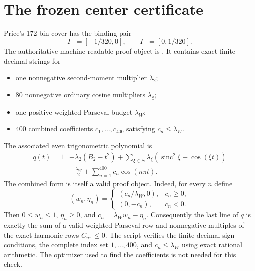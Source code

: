 \documentclass[11pt]{amsart}
\DeclareMathOperator{\sinc}{sinc}
\begin{document}
\section{The frozen center certificate}
Price's 172-bin cover has the binding pair
\[
 I_-=[-1/320,0],\qquad I_+=[0,1/320].
\]
The authoritative machine-readable proof object is
.
It contains exact finite-decimal strings for
\begin{itemize}
\item one nonnegative second-moment multiplier $\lambda_2$;
\item 80 nonnegative ordinary cosine multipliers $\lambda_\xi$;
\item one positive weighted-Parseval budget $\lambda_W$;
\item 400 combined coefficients $c_1,\ldots,c_{400}$ satisfying
      $c_n\le\lambda_W$.
\end{itemize}
The associated even trigonometric polynomial is
\begin{align*}
q(t)=1&+\lambda_2(B_2-t^2)
+\sum_{\xi\in\Xi}\lambda_\xi(\sinc^2\xi-\cos(\xi t))\\
&+\frac{\lambda_W}{2}+\sum_{n=1}^{400}c_n\cos(n\pi t).
\end{align*}
The combined form is itself a valid proof object.  Indeed, for every $n$ define
\[
 (w_n,\eta_n)=
 \begin{cases}
 (c_n/\lambda_W,0),&c_n\ge0,\\
 (0,-c_n),&c_n<0.
 \end{cases}
\]
Then $0\le w_n\le1$, $\eta_n\ge0$, and
$c_n=\lambda_Ww_n-\eta_n$.  Consequently the last line of $q$ is exactly the
sum of a valid weighted-Parseval row and nonnegative multiples of the exact
harmonic rows $C_{n\pi}\le0$.  The script
 verifies the finite-decimal
sign conditions, the complete index set $1,\ldots,400$, and
$c_n\le\lambda_W$ using exact rational arithmetic.  The optimizer used to find
the coefficients is not needed for this check.
\end{document}
